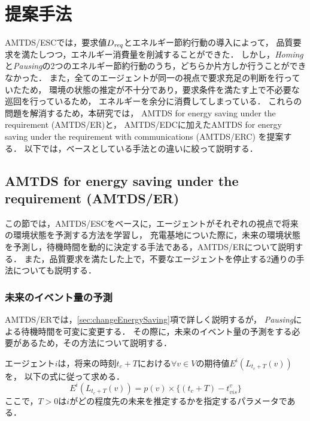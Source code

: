 \documentclass[12pt,a4j,twoside]{jarticle}
\def\Dreq{{D_{\it req}}}
\begin{document}
  \section{提案手法}
  AMTDS/ESCでは，要求値$\Dreq$とエネルギー節約行動の導入によって，
  品質要求を満たしつつ，エネルギー消費量を削減することができた．
  しかし，{\em Homing}と{\em Pausing}の2つのエネルギー節約行動のうち，どちらか片方しか行うことができなかった．
  また，全てのエージェントが同一の視点で要求充足の判断を行っていたため，
  環境の状態の推定が不十分であり，要求条件を満たす上で不必要な巡回を行っているため，
  エネルギーを余分に消費してしまっている．
  これらの問題を解消するため，本研究では，
  AMTDS for energy saving under the requirement (AMTDS/ER)と，
  AMTDS/EDCに加えたAMTDS for energy saving under the requirement with communications (AMTDS/ERC)
  を提案する．
  以下では，ベースとしている手法との違いに絞って説明する．
  
  \subsection{AMTDS for energy saving under the requirement (AMTDS/ER)}
  この節では，AMTDS/ESCをベースに，エージェントがそれぞれの視点で将来の環境状態を予測する方法を学習し，
  充電基地についた際に，未来の環境状態を予測し，待機時間を動的に決定する手法である，AMTDS/ERについて説明する．
  また，品質要求を満たした上で，不要なエージェントを停止する2通りの手法についても説明する．  

  \subsubsection{未来のイベント量の予測}\label{sec:predict}
  AMTDS/ERでは，\ref{sec:changeEnergySaving}項で詳しく説明するが，
  {\em Pausing}による待機時間を可変に変更する．
  その際に，未来のイベント量の予測をする必要があるため，その方法について説明する．
  \par

  エージェント$i$は，将来の時刻$t_c+T$における$\forall v\in V$の期待値$E^i(L_{t_c+T}(v))$を，
  以下の式に従って求める．
  \begin{equation}\label{eq:estimation}
    E^i(L_{t_c+T}(v)) = p(v) \times \{(t_c+T)-t^v_{vis}\}
  \end{equation}
  ここで，$T>0$は$i$がどの程度先の未来を推定するかを指定するパラメータである．
  
\end{document}
